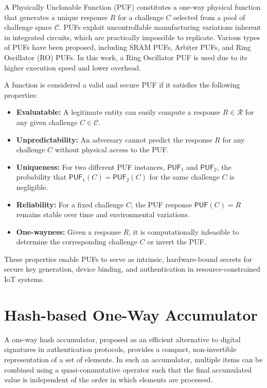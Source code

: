 \documentclass[12pt,a4paper]{report}
\begin{document}
A Physically Unclonable Function (PUF) constitutes a one-way physical function that
generates a unique response $R$ for a challenge $C$ selected from a pool of
challenge space $\mathcal{C}$.
PUFs exploit uncontrollable manufacturing variations inherent in integrated circuits,
which are practically impossible to replicate.
Various types of PUFs have been proposed, including SRAM PUFs, Arbiter PUFs, and
Ring Oscillator (RO) PUFs.
In this work, a Ring Oscillator PUF is used due to its higher execution speed and
lower overhead.

A function is considered a valid and secure PUF if it satisfies the following
properties:

\begin{itemize}
  \item \textbf{Evaluatable:} A legitimate entity can easily compute a response
    $R \in \mathcal{R}$ for any given challenge $C \in \mathcal{C}$.

  \item \textbf{Unpredictability:} An adversary cannot predict the response $R$ for
    any challenge $C$ without physical access to the PUF.

  \item \textbf{Uniqueness:} For two different PUF instances, $\mathsf{PUF}_1$ and
    $\mathsf{PUF}_2$, the probability that
    $\mathsf{PUF}_1(C) = \mathsf{PUF}_2(C)$ for the same challenge $C$ is
    negligible.

  \item \textbf{Reliability:} For a fixed challenge $C$, the PUF response
    $\mathsf{PUF}(C) = R$ remains stable over time and environmental variations.

  \item \textbf{One-wayness:} Given a response $R$, it is computationally infeasible
    to determine the corresponding challenge $C$ or invert the PUF.
\end{itemize}

These properties enable PUFs to serve as intrinsic, hardware-bound secrets for secure
key generation, device binding, and authentication in resource-constrained IoT
systems.

\section{Hash-based One-Way Accumulator}

A one-way hash accumulator, proposed as an efficient alternative to digital
signatures in authentication protocols, provides a compact, non-invertible
representation of a set of elements.
In such an accumulator, multiple items can be combined using a quasi-commutative
operator such that the final accumulated value is independent of the order in which
elements are processed.
\end{document}

